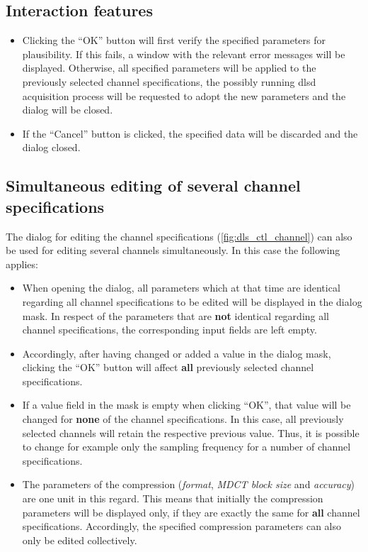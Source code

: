 \documentclass[a4paper,12pt,BCOR6mm,bibtotoc,idxtotoc]{scrbook}
\begin{document}

\subsection{Interaction features}

\begin{itemize} \item Clicking the ``OK'' button will first verify the
specified parameters for plausibility. If this fails, a window with the
relevant error messages will be displayed. Otherwise, all specified parameters
will be applied to the previously selected channel specifications, the
possibly running dlsd acquisition process will be requested to adopt the new
parameters and the dialog will be closed.  \item If the ``Cancel'' button is
clicked, the specified data will be discarded and the dialog closed.
\end{itemize}


\subsection{Simultaneous editing of several channel specifications} \label{sec:manager_kanaele_edit_parallel}

The dialog for editing the channel specifications
(\autoref{fig:dls_ctl_channel}) can also be used for editing several channels
simultaneously. In this case the following applies:

\begin{itemize}
\item When opening the dialog, all parameters which at that time are identical regarding all channel specifications to be edited will be displayed in the dialog mask. In respect of the parameters that are \textbf{not} identical regarding all channel specifications, the corresponding input fields are left empty.
\item Accordingly, after having changed or added a value in the dialog mask, clicking the ``OK'' button will affect \textbf{all} previously selected channel specifications.
\item If a value field in the mask is empty when clicking ``OK'', that value will be changed for \textbf{none} of the channel specifications. In this case, all previously selected channels will retain the respective previous value. Thus, it is possible to change for example only the sampling frequency for a number of channel specifications.
\item The parameters of the compression (\textit{format}, \textit{MDCT block size} and \textit{accuracy}) are one unit in this regard. This means that initially the compression parameters will be displayed only, if they are exactly the same for \textbf{all} channel specifications. Accordingly, the specified compression parameters can also only be edited collectively. \end{itemize}
\end{document}
